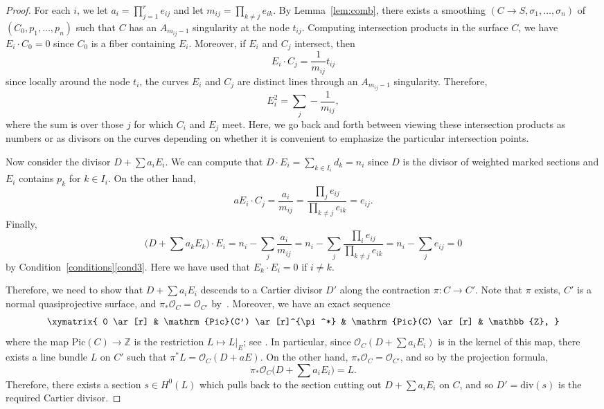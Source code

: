 \documentclass[11pt]{amsart}
\numberwithin{equation}{section}
\theoremstyle{definition}
\theoremstyle{remark}
\newcommand{\calO}{\mathcal O}
\newcommand{\Pic}{\mathrm{Pic}}
\begin{document}
\begin{proof}

For each $i$, we let $a_i = \prod_{j = 1}^r e_{ij}$ and let $m_{ij} = \prod_{k \neq j} e_{ik}$. By Lemma~\ref{lem:comb}, there exists a smoothing $(C \to S, \sigma_1, \ldots, \sigma_n)$ of $(C_0, p_1, \ldots, p_n)$ such that $C$ has an $A_{m_{ij} -1}$ singularity at the node $t_{ij}$. Computing intersection products in the surface $C$, we have $E_i\cdot C_0 = 0$ since $C_0$ is a fiber containing $E_i$. Moreover, if $E_i$ and $C_j$ intersect, then
$$
E_i\cdot C_{j} = \frac{1}{m_{ij}} t_{ij}
$$
since locally around the node $t_i$, the curves $E_i$ and $C_j$ are distinct lines through an $A_{m_{ij} - 1}$ singularity. Therefore, 
$$
E_i^2 = \sum_j -\frac{1}{m_{ij}}, 
$$
where the sum is over those $j$ for which $C_i$ and $E_j$ meet. Here, we go back and forth between viewing these intersection products as numbers or as divisors on the curves depending on whether it is convenient to emphasize the particular intersection points. 

Now consider the divisor $D + \sum a_iE_i$. We can compute that $D\cdot E_i = \sum_{k \in I_i} d_k = n_i$ since $D$ is the divisor of weighted marked sections and $E_i$ contains $p_k$ for $k \in I_i$. On the other hand,
$$
aE_i\cdot C_j = \frac{a_i}{m_{ij}} = \frac{\prod_j e_{ij}}{\prod_{k \neq j}e_{ik}} = e_{ij}.
$$
Finally, 
$$
\Big(D + \sum a_kE_k\Big)\cdot E_i = n_i - \sum_j \frac{a_i}{m_{ij}} = n_i - \sum_j \frac{\prod_i e_{ij}}{\prod_{k \neq j}e_{ik}} = n_i - \sum_j e_{ij} = 0
$$
by Condition~\ref{conditions}\eqref{cond3}. Here we have used that $E_k\cdot E_i = 0$ if $i \neq k$. 

Therefore, we need to show that $D + \sum a_iE_i$ descends to a Cartier divisor $D'$ along the contraction $\pi \colon C \to C'$. Note that $\pi$ exists, $C'$ is a normal quasiprojective surface, and $\pi_*\calO_C = \calO_{C'}$ by~\cite[Theorem~3.7]{km}. Moreover, we have an exact sequence 
\begin{equation}\label{eqn:exact}
\xymatrix{
0 \ar[r] & \Pic(C') \ar[r]^{\pi^*} & \Pic(C) \ar[r] & \mathbb{Z}, 
}
\end{equation}
where the map $\Pic(C) \to \mathbb{Z}$ is the restriction $L \mapsto L|_E$; see \cite[Corollary 3.17]{km}. In particular, since  $\calO_C(D + \sum a_iE_i)$ is in the kernel of this map,  there exists a line bundle $L$ on $C'$ such that $\pi^*L = \calO_C(D + aE)$. On the other hand, $\pi_*\calO_C = \calO_{C'}$, and so by the projection formula, 
$$
\pi_*\calO_C\Big(D + \sum a_iE_i\Big) = L.
$$
Therefore, there exists a section $s \in H^0(L)$ which pulls back to the section cutting out $D + \sum a_iE_i$ on $C$, and so $D' = \mathrm{div}(s)$ is the required Cartier divisor. \end{proof} 
\end{document}
